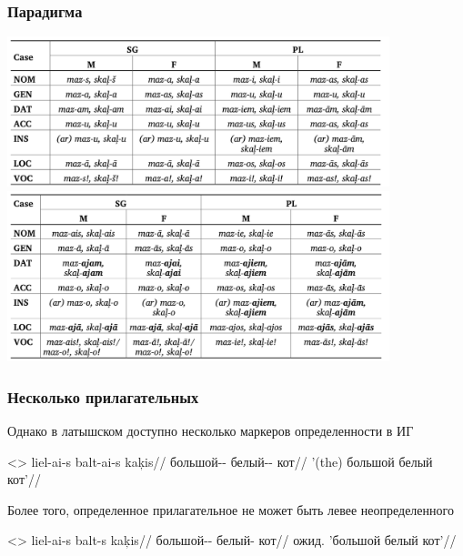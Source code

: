 \documentclass[9pt, t]{beamer}
\begin{document}
\begin{frame}
    \frametitle{Парадигма}

    \includegraphics[width=30em]{lat paradigm 1.png}
    \includegraphics[width=30em]{lat paradigm 2.png}

\end{frame}

\begin{frame}
    \frametitle{Несколько прилагательных}

    Однако в латышском доступно несколько маркеров определенности в ИГ

    \ex<>
        \begingl
            \gla liel-ai-s balt-ai-s kaķis//
            \glb большой-\Def-\Nom{} белый-\Def-\Nom{} кот//
            \glft '(the) большой белый кот'//
        \endgl
    \xe

    \pause

    Более того, определенное прилагательное не может быть левее неопределенного

    \ex<>
        \begingl
            \gla \ljudge*liel-ai-s balt-s kaķis//
            \glb большой-\Def-\Nom{} белый-\Nom{} кот//
            \glft ожид. 'большой белый кот'//
        \endgl
    \xe

\end{frame}
\end{document}
